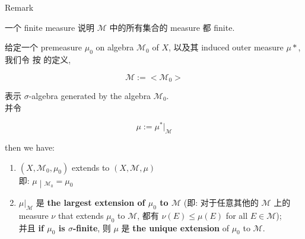 \begin{qlremark}{Remark}

一个 finite measure 说明 \(\mathcal{M}\) 中的所有集合的 measure 都 finite.

\end{qlremark}

\begin{theorem}{}

给定一个 premeasure \(\mu_{0}\) on algebra \(\mathcal{M}_{0}\) of \(X\), 以及其 induced outer measure \(\mu \ast\), 我们令 按  的定义,

\[\mathcal{M} := < \mathcal{M}_{0} >\]

表示 \(\sigma\)-algebra generated by the algebra \(\mathcal{M}_{0}\).\\
并令

\[\mu := \mu^{\ast}|_{\mathcal{M}}\]

then we have:

\begin{enumerate}
\item
  \((X,\mathcal{M}_{0},\mu_{0})\) extends to \((X,\mathcal{M},\mu)\)\\
  即: \(\left. \mu \middle| {}_{\mathcal{M}_{0}} = \mu_{0} \right.\)
\item
  \(\mu|_{\mathcal{M}}\) 是 \textbf{the largest extension of \(\mu_{0}\) to \(\mathcal{M}\)} (即: 对于任意其他的 \(\mathcal{M}\) 上的 measure \(\nu\) that extends \(\mu_{0}\) to \(\mathcal{M}\), 都有 \(\nu(E) \leq \mu(E)\) for all \(E \in \mathcal{M}\));\\
  并且 \textbf{if \(\mu_{0}\) is \(\sigma\)-finite}, 则 \(\mu\) 是 \textbf{the unique extension} of \(\mu_{0}\) to \(\mathcal{M}\).
\end{enumerate}

\end{theorem}

